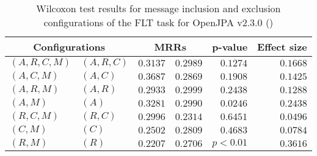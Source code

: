 
\begin{table}
\begin{spacing}{1.2}
\centering
\caption{Wilcoxon test results for message inclusion and exclusion configurations of the FLT task for OpenJPA v2.3.0 (\ctwo)}
\label{table:versus-wilcox-openjpa-flt-message}
\begin{tabular}{ll|rr|rr}
\toprule
      \multicolumn{2}{c|}{Configurations} &                \multicolumn{2}{c|}{MRRs} &             p-value & Effect size \\
\midrule
 $(A,R,C,M)$ &  $(A,R,C)$ &  $\bm{0.3137}$ &       $0.2989$ & $0.1274$ &    $0.1668$ \\
   $(A,C,M)$ &    $(A,C)$ &  $\bm{0.3687}$ &       $0.2869$ & $0.1908$ &    $0.1425$ \\
   $(A,R,M)$ &    $(A,R)$ &       $0.2933$ &  $\bm{0.2999}$ & $0.2438$ &    $0.1288$ \\
     $(A,M)$ &      $(A)$ &  $\bm{0.3281}$ &       $0.2990$ & $0.0246$ &    $0.2438$ \\
   $(R,C,M)$ &    $(R,C)$ &  $\bm{0.2996}$ &       $0.2314$ & $0.6451$ &    $0.0496$ \\
     $(C,M)$ &      $(C)$ &       $0.2502$ &  $\bm{0.2809}$ & $0.4683$ &    $0.0784$ \\
     $(R,M)$ &      $(R)$ &       $0.2207$ &  $\bm{0.2706}$ & $p<0.01$ &    $0.3616$ \\
\bottomrule
\end{tabular}

\end{spacing}
\end{table}

